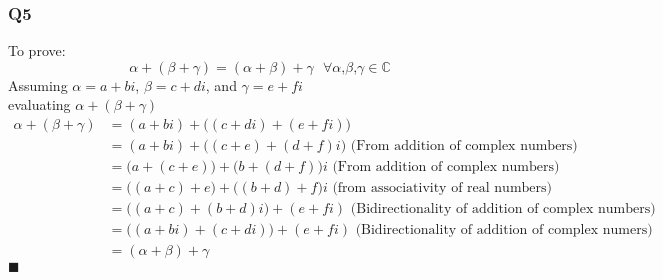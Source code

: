 \documentclass{article}
\begin{document}
\subsubsection*{Q5}
To prove:
\begin{equation*}
    \alpha + \left( \beta + \gamma \right) = \left( \alpha + \beta \right) + \gamma \textrm{ }\forall \alpha \textrm{,} \beta \textrm{,} \gamma \in \mathbb{C}
\end{equation*}
Assuming $\alpha = a + bi$, $\beta = c + di$, and $\gamma = e + fi$ \\
evaluating $\alpha + \left( \beta + \gamma \right)$
\begin{equation*}
    \begin{split}
        \alpha + \left( \beta + \gamma \right) &= (a + bi) + \Big( (c + di ) + (e + fi) \Big) \\
                                               &= (a + bi) + \Big( (c + e) + (d + f)i \Big)  \textrm{ (From addition of complex numbers)}\\
                                               &=  \Big(a + ( c + e) \Big) + \Big( b + ( d + f) \Big) i\textrm{ (From addition of complex numbers)} \\
                                               &= \Big( (a + c) + e \Big) + \Big( (b + d) + f \Big) i\textrm{  (from associativity of real numbers)} \\
                                               &= \Big( (a + c) + (b +d )i \Big) + (e + fi) \textrm{ (Bidirectionality of addition of complex numbers)} \\
                                               &= \Big( (a+ bi) + (c + di) \Big) + (e + fi) \textrm{ (Bidirectionality of addition of complex numers)} \\
                                               &= (\alpha + \beta) + \gamma
    \end{split}
\end{equation*}
$\blacksquare$
\end{document}
